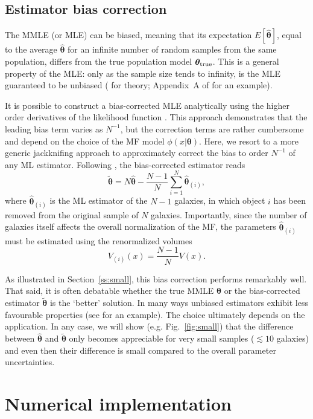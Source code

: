\documentclass[a4paper,fleqn,usenatbib]{mnras}
\newcommand{\be}{\begin{equation}}
\newcommand{\ee}{\end{equation}}
\newcommand{\veff}{V}%
\newcommand{\fig}[1]{Fig.~\ref{fig:#1}}
\renewcommand{\ss}[1]{Section~\ref{ss:#1}}
\newcommand{\eg}{e.g.\xspace}
\newcommand{\para}{{\bm{\theta}}}
\begin{document}
\subsection{Estimator bias correction}\label{ss:bias}

The MMLE (or MLE) can be biased, meaning that its expectation $E[\hat{\para}]$, equal to the average $\hat{\para}$ for an infinite number of random samples from the same population, differs from the true population model $\para_{\rm true}$. This is a general property of the MLE: only as the sample size tends to infinity, is the MLE guaranteed to be unbiased (\citealp{Kendall1979} for theory; Appendix~A of \cite{Robotham2015} for an example).

It is possible to construct a bias-corrected MLE analytically using the higher order derivatives of the likelihood function \citep{Cordeiro1994}. This approach demonstrates that the leading bias term varies as $N^{-1}$, but the correction terms are rather cumbersome and depend on the choice of the MF model $\phi(x|\para)$. Here, we resort to a more generic jackknifing approach to approximately correct the bias to order $N^{-1}$ of any ML estimator. Following \cite{Efron1981}, the bias-corrected estimator reads
%
\be\label{eq:biascorrection}
	\tilde\para = N\hat\para-\frac{N-1}{N}\sum_{i=1}^N\hat\para_{(i)},
\ee
%
where $\hat\para_{(i)}$ is the ML estimator of the $N-1$ galaxies, in which object $i$ has been removed from the original sample of $N$ galaxies. Importantly, since the number of galaxies itself affects the overall normalization of the MF, the parameters $\hat\para_{(i)}$ must be estimated using the renormalized volumes
%
\be
	V_{(i)}(x) = \frac{N-1}{N}\veff(x).
\ee

As illustrated in \ss{small}, this bias correction performs remarkably well. That said, it is often debatable whether the true MMLE $\hat\para$ or the bias-corrected estimator $\tilde\para$ is the `better' solution. In many ways unbiased estimators exhibit less favourable properties (see \citealp{Hardy2002} for an example). The choice ultimately depends on the application. In any case, we will show (\eg \fig{small}) that the difference between $\hat\para$ and $\tilde\para$ only becomes appreciable for very small samples ($\lesssim10$ galaxies) and even then their difference is small compared to the overall parameter uncertainties.


\section{Numerical implementation}\label{s:implementation}
\end{document}
